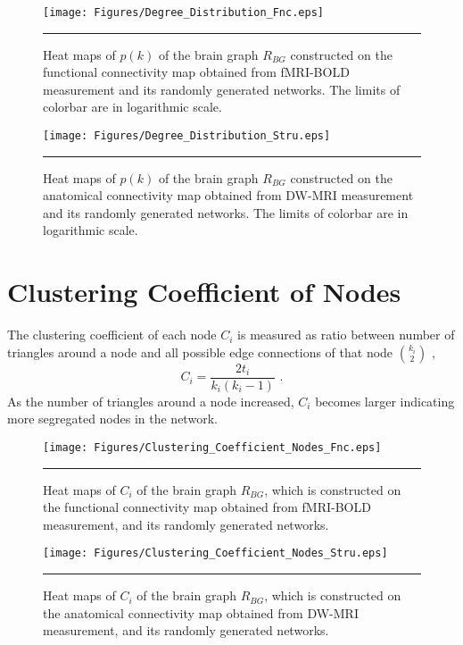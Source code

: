 \begin{figure}[htbp]
 
  \centering
	 \texttt{[image: Figures/Degree\_Distribution\_Fnc.eps]}
	\rule{35em}{0.5pt} 
  \caption[Degree Distribution, FCM]{Heat maps of $p(k)$ of the brain graph $R_{BG}$ constructed on the functional connectivity map obtained from fMRI-BOLD measurement and its randomly generated networks. The limits of colorbar are in logarithmic scale.} 
    \label{fig:Degree Distribution, FCM}
 	
\end{figure}



\begin{figure}[htbp]
 
  \centering
	 \texttt{[image: Figures/Degree\_Distribution\_Stru.eps]}
   \rule{35em}{0.5pt} 
  \caption[Degree Distribution, ACM]{Heat maps of $p(k)$ of the brain graph $R_{BG}$ constructed on the anatomical connectivity map obtained from DW-MRI measurement and its randomly generated networks. The limits of colorbar are in logarithmic scale.} 
    \label{fig:Degree Distribution, ACM}
 	
\end{figure}

\clearpage

\section{Clustering Coefficient of Nodes}

The clustering coefficient of each node $C_i$ is measured as ratio between number of triangles around a node and all possible edge connections of that node $\binom{k_i}{2}$ \citep{WAT98}, 
\begin{equation}
C_i =  \frac{2t_i}{k_i(k_i -1)} \,\, .
\end{equation}
As the number of triangles around a node increased, $C_i$ becomes larger indicating more segregated nodes in the network.
\begin{figure}[htbp]
  \centering
	 \texttt{[image: Figures/Clustering\_Coefficient\_Nodes\_Fnc.eps]}
	\rule{35em}{0.5pt}  
  \caption[Clustering Coefficient of Nodes, FCM]{Heat maps of $C_i$ of the brain graph $R_{BG}$, which is constructed on the functional connectivity map obtained from fMRI-BOLD measurement, and its randomly generated networks.} 
    \label{fig:Clustering Coefficient of Nodes, FCM}
 	
\end{figure}

\begin{figure}[htbp]
 
  \centering
	 \texttt{[image: Figures/Clustering\_Coefficient\_Nodes\_Stru.eps]}
	\rule{35em}{0.5pt}  
  \caption[Clustering Coefficient of Nodes, ACM]{Heat maps of $C_i$ of the brain graph $R_{BG}$, which is constructed on the anatomical connectivity map obtained from DW-MRI measurement, and its randomly generated networks.} 
    \label{fig:Clustering Coefficient of Nodes, ACM}
 	
\end{figure}

